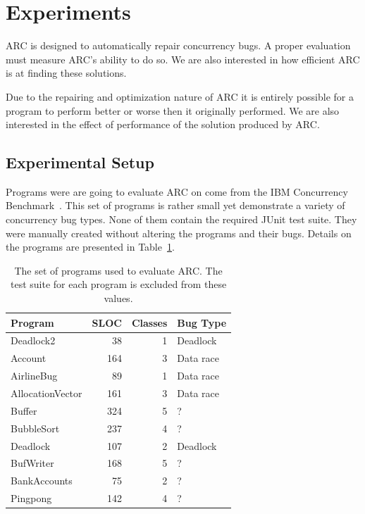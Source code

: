 \documentclass[10pt, conference, compsocconf]{IEEEtran}
\begin{document}
\section{Experiments}
\label{sec:experiments}

ARC is designed to automatically repair concurrency bugs. A proper
evaluation must measure ARC's ability to do so. We are also interested in how
efficient ARC is at finding these solutions.

Due to the repairing and optimization nature of ARC it is entirely possible for
a program to perform better or worse then it originally performed. We are
also interested in the effect of performance of the solution produced by ARC.

\subsection{Experimental Setup}
\label{sec:experimental_setup}

Programs were are going to evaluate ARC on come from the IBM
Concurrency Benchmark~\cite{EHSU06}. This set of programs is rather small yet
demonstrate a variety of concurrency bug types. None of them contain the required
JUnit test suite.  They were manually created without altering the programs and their
bugs. Details on the programs are presented in Table~\ref{tbl:used_programs}.

\begin{table}[!h]
\begin{center}
\begin{tabular}{|l|r|r|l|}
\hline
\textbf{Program} &
\textbf{SLOC} &
\textbf{Classes} &
\textbf{Bug Type}
\\\hline
Deadlock2 & 38 & 1 & Deadlock
\\\hline
Account & 164 & 3 & Data race
\\\hline
AirlineBug & 89 & 1 & Data race
\\\hline
AllocationVector & 161 & 3 & Data race
\\\hline
Buffer & 324 & 5 & ?
\\\hline
BubbleSort & 237 & 4 & ?
\\\hline
Deadlock & 107 & 2 & Deadlock
\\\hline
BufWriter& 168 & 5 & ?
\\\hline
BankAccounts & 75 & 2 & ?
\\\hline
Pingpong & 142 & 4 & ?
\\\hline
\end{tabular}
\caption{The set of programs used to evaluate ARC. The test suite for each
program is excluded from these values.}
\label{tbl:used_programs}
\end{center}
\end{table}
\end{document}
